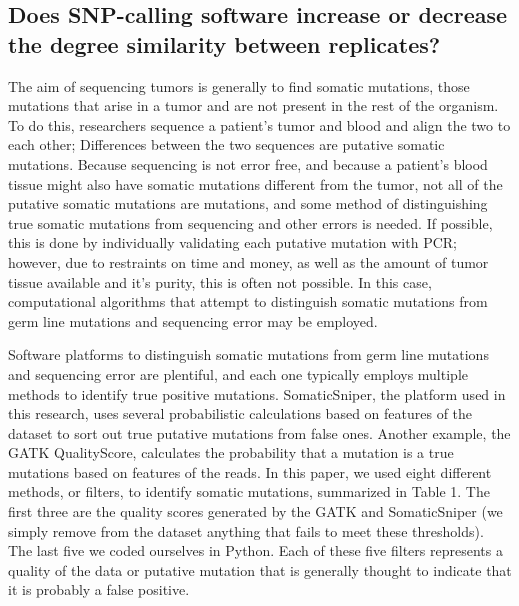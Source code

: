 \documentclass[11pt]{article} %
\begin{document}
\subsection{Does SNP-calling software increase or decrease the degree similarity between replicates?}

The aim of sequencing tumors is generally to find somatic mutations, those mutations that arise in a tumor and are not present in the rest of the organism. To do this, researchers sequence a patient's tumor and blood and align the two to each other; Differences between the two sequences are putative somatic mutations. Because sequencing is not error free, and because a patient's blood tissue might also have somatic mutations different from the tumor, not all of the putative somatic mutations are mutations, and some method of distinguishing true somatic mutations from sequencing and other errors is needed. If possible, this is done by individually validating each putative mutation with PCR; however, due to restraints on time and money, as well as the amount of tumor tissue available and it's purity, this is often not possible. In this case, computational algorithms that attempt to distinguish somatic mutations from germ line mutations and sequencing error may be employed. 

Software platforms to distinguish somatic mutations from germ line mutations and sequencing error are plentiful, and each one typically employs multiple methods to identify true positive mutations. SomaticSniper, the platform used in this research, uses several probabilistic calculations based on features of the dataset to sort out true putative mutations from false ones. Another example, the GATK QualityScore, calculates the probability that a mutation is a true mutations based on features of the reads. In this paper, we used eight different methods, or filters, to identify somatic mutations, summarized in Table 1. The first three are the quality scores generated by the GATK and SomaticSniper (we simply remove from the dataset anything that fails to meet these thresholds). The last five we coded ourselves in Python. Each of these five filters represents a quality of the data or putative mutation that is generally thought to indicate that it is probably a false positive.
\end{document}
